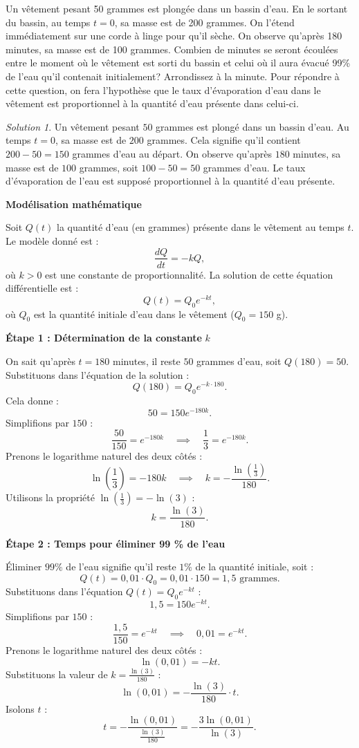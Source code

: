 \documentclass[
  12pt,
  letterpaper,
]{book}
\theoremstyle{remark}
\newtheorem*{solution}{Solution}
\begin{document}
Un vêtement pesant 50 grammes est plongée dans un bassin d'eau. En le
sortant du bassin, au temps \(t=0\), sa masse est de 200 grammes. On
l'étend immédiatement sur une corde à linge pour qu'il sèche. On observe
qu'après 180 minutes, sa masse est de 100 grammes. Combien de minutes se
seront écoulées entre le moment où le vêtement est sorti du bassin et
celui où il aura évacué 99\% de l'eau qu'il contenait initialement?
Arrondissez à la minute. Pour répondre à cette question, on fera
l'hypothèse que le taux d'évaporation d'eau dans le vêtement est
proportionnel à la quantité d'eau présente dans celui-ci.

\begin{solution}

Un vêtement pesant \(50\) grammes est plongé dans un bassin d'eau. Au
temps \(t=0\), sa masse est de \(200\) grammes. Cela signifie qu'il
contient \(200 - 50 = 150\) grammes d'eau au départ. On observe qu'après
\(180\) minutes, sa masse est de \(100\) grammes, soit \(100 - 50 = 50\)
grammes d'eau. Le taux d'évaporation de l'eau est supposé proportionnel
à la quantité d'eau présente.

\textbf{Modélisation mathématique}

Soit \(Q(t)\) la quantité d'eau (en grammes) présente dans le vêtement
au temps \(t\). Le modèle donné est : \[
\frac{dQ}{dt} = -kQ,
\] où \(k > 0\) est une constante de proportionnalité. La solution de
cette équation différentielle est : \[
Q(t) = Q_0 e^{-kt},
\] où \(Q_0\) est la quantité initiale d'eau dans le vêtement
(\(Q_0 = 150\) g).

\textbf{Étape 1 : Détermination de la constante} \(k\)

On sait qu'après \(t = 180\) minutes, il reste \(50\) grammes d'eau,
soit \(Q(180) = 50\). Substituons dans l'équation de la solution : \[
Q(180) = Q_0 e^{-k \cdot 180}.
\] Cela donne : \[
50 = 150 e^{-180k}.
\] Simplifions par \(150\) : \[
\frac{50}{150} = e^{-180k} \quad \implies \quad \frac{1}{3} = e^{-180k}.
\] Prenons le logarithme naturel des deux côtés : \[
\ln\left(\frac{1}{3}\right) = -180k \quad \implies \quad k = -\frac{\ln\left(\frac{1}{3}\right)}{180}.
\] Utilisons la propriété \(\ln\left(\frac{1}{3}\right) = -\ln(3)\) : \[
k = \frac{\ln(3)}{180}.
\]

\textbf{Étape 2 : Temps pour éliminer 99 \% de l'eau}

Éliminer \(99\%\) de l'eau signifie qu'il reste \(1\%\) de la quantité
initiale, soit : \[
Q(t) = 0{,}01 \cdot Q_0 = 0{,}01 \cdot 150 = 1{,}5 \text{ grammes}.
\] Substituons dans l'équation \(Q(t) = Q_0 e^{-kt}\) : \[
1{,}5 = 150 e^{-kt}.
\] Simplifions par \(150\) : \[
\frac{1{,}5}{150} = e^{-kt} \quad \implies \quad 0{,}01 = e^{-kt}.
\] Prenons le logarithme naturel des deux côtés : \[
\ln(0{,}01) = -kt.
\] Substituons la valeur de \(k = \frac{\ln(3)}{180}\) : \[
\ln(0{,}01) = -\frac{\ln(3)}{180} \cdot t.
\] Isolons \(t\) : \[
t = -\frac{\ln(0{,}01)}{\frac{\ln(3)}{180}} = -\frac{3 \ln(0{,}01)}{\ln(3)}.
\]


\end{solution}
\end{document}
